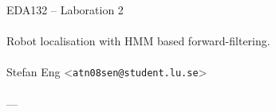 \documentclass{article}
\begin{document}
  \begin{center}
    EDA132 -- Laboration 2\\
    \ \\
    {\Large Robot localisation with HMM based forward-filtering.} \\
    \ \\
    Stefan Eng <\texttt{atn08sen@student.lu.se}> \\
    \ \\
    ---
  \end{center}
\end{document}

